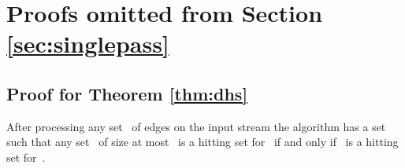 \documentclass[draft,a4paper]{llncs}
\begin{document}



\newpage
\appendix
\section{Proofs omitted from Section \ref{sec:singlepass}}
\subsection{Proof for Theorem \ref{thm:dhs}}

\begin{lemma}\label{lem:dhs}
After processing any set~ of edges on the input stream the algorithm has a set~ such that any set~ of size at most~ is a hitting set for~ if and only if~ is a hitting set for~.
\end{lemma}
\end{document}
